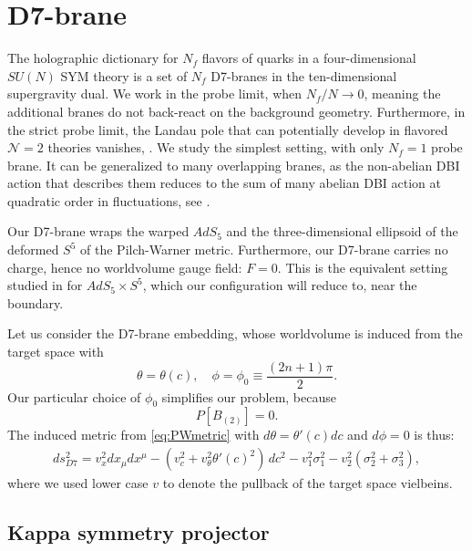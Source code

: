 \section{D7-brane}\label{sec:D7brane}

The holographic dictionary for $N_f$ flavors of quarks in a four-dimensional $SU(N)$ SYM theory is a set of $N_f$ D7-branes in the ten-dimensional supergravity dual. We work in the probe limit, when $N_f/N \rightarrow 0$, meaning the additional branes do not back-react on the background geometry. Furthermore, in the strict probe limit, the Landau pole that can potentially develop in flavored $\mathcal{N}=2$ theories vanishes, \cite{CasalderreySolana:2011us}. We study the simplest setting, with only $N_f=1$ probe brane. It can be generalized to many overlapping branes, as the non-abelian DBI action that describes them reduces to the sum of many abelian DBI action at quadratic order in fluctuations, see \cite{Kruczenski:2003uq}. 

Our D7-brane wraps the warped $AdS_5$ and the three-dimensional ellipsoid of the deformed $S^5$ of the Pilch-Warner metric. Furthermore, our D7-brane carries no charge, hence no worldvolume gauge field: $F = 0$. This is the equivalent setting studied in \cite{Karch:2002sh} for $AdS_5 \times S^5$, which our configuration will reduce to, near the boundary.


Let us consider the D7-brane embedding, whose worldvolume is induced from the target space with 
\begin{equation}\label{eq:ansatz}
 \theta = \theta(c), \quad \phi=\phi_0\equiv\frac{(2 n + 1)\pi}{2}.
\end{equation}
Our particular choice of $\phi_0$ simplifies our problem, because
\begin{equation}
 P[B_{(2)}] = 0.
\end{equation}
The induced metric from \eqref{eq:PWmetric} with $d\theta = \theta'(c) dc$ and $d\phi=0$ is thus:
\begin{align}\label{eq:PWmetric}
ds_{D7}^2 =
v_x^2 dx_\mu dx^\mu 
- (v_c^2 +v_\theta^2 \theta'(c)^2)\, dc^2 - v_1^2 \sigma_1^2 - v_2^2 (\sigma_2^2 + \sigma_3^2),
\end{align}
where we used lower case $v$ to denote the pullback of the target space vielbeins.



\subsection{Kappa symmetry projector}

